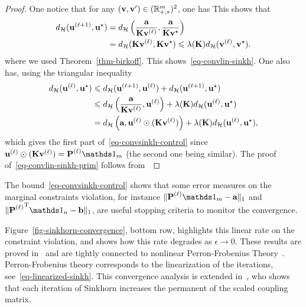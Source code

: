 \begin{proof}
	One notice that for any $(\vD,\vD') \in (\RR_{+,*}^m)^2$, one has 
	This shows that
	\begin{align*}
		\Hilbert(\itt{\uD},\uD^\star) &= \Hilbert\pa{ \frac{\a}{\K \it{\vD}}, \frac{\a}{\K \vD^\star} } \\
		&= \Hilbert( \K \it{\vD}, \K \vD^\star ) \leq \la(\K) \Hilbert( \it{\vD}, \vD^\star ).
	\end{align*}
	where we used Theorem~\ref{thm-birkoff}. This shows~\eqref{eq-convlin-sinkh}.  One also has, using the triangular inequality
	\begin{align*}
		\Hilbert(\it{\uD},\uD^\star) &\leq \Hilbert(\itt{\uD},\it{\uD}) + \Hilbert(\itt{\uD},\uD^\star) \\
		&\leq \Hilbert\pa{ \frac{\a}{\K \it{\vD}},\it{\uD} } + \la(\K) \Hilbert(\it{\uD},\uD^\star) \\
		&= \Hilbert\pa{ \a,\it{\uD} \odot  ( \K \it{\vD} ) } + \la(\K) \Hilbert(\it{\uD},\uD^\star), 
	\end{align*}
	which gives the first part of~\eqref{eq-convsinkh-control} since 
	$\it{\uD} \odot  ( \K \it{\vD} ) = \it{\P}\ones_m$ (the second one being similar).
	The proof of~\eqref{eq-convlin-sinkh-prim} follows from~\cite[Lemma 3]{franklin1989scaling}
\end{proof}
 
The bound~\eqref{eq-convsinkh-control} shows that some error measures on the marginal constraints violation, for instance $\| \it{\P} \ones_m - \a \|_1$ and $\|\transp{\it{\P}} \ones_n - \b \|_1$, are useful stopping criteria to monitor the convergence. 

Figure~\ref{fig-sinkhorn-convergence}, bottom row, highlights this linear rate on the constraint violation, and shows how this rate degrades as $\epsilon\rightarrow 0$. 
%
These results are proved in~\cite{franklin1989scaling} and are tightly connected to nonlinear Perron-Frobenius Theory~\cite{lemmens2012nonlinear}. Perron-Frobenius theory corresponds to the linearization of the iterations, see~\eqref{eq-linearized-sinkh}. This convergence analysis is extended in~\cite{linial1998deterministic}, who shows that each iteration of Sinkhorn increases the permanent of the scaled coupling matrix. 
